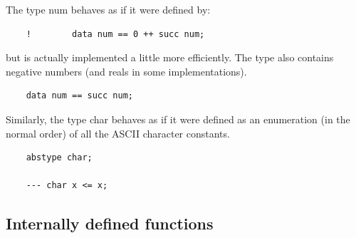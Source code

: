 The type num behaves as if it were defined by:
\begin{verbatim}
    !        data num == 0 ++ succ num;
\end{verbatim}
but is actually implemented a little more efficiently.
The type also contains negative numbers (and reals in some implementations).
\begin{verbatim}
    data num == succ num;
\end{verbatim}
Similarly, the type char behaves as if it were defined as an enumeration
(in the normal order) of all the ASCII character constants.
\begin{verbatim}
    abstype char;

    --- char x <= x;
\end{verbatim}
\subsection{Internally defined functions}

